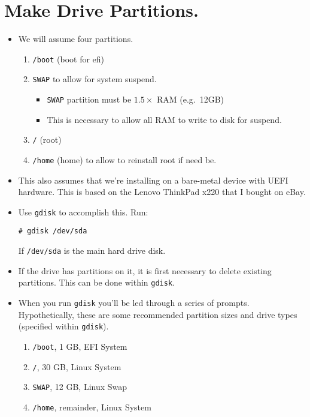 \documentclass{article}
\begin{document}
\section{Make Drive Partitions.}
  \begin{itemize}
    \item We will assume four partitions.
    \begin{enumerate}
      \item \verb|/boot| (boot for efi)
      \item \verb|SWAP| to allow for system suspend.
      \begin{itemize}
        \item \verb|SWAP| partition must be $1.5\times$ RAM (e.g.~12GB)
        \item This is necessary to allow all RAM to write to disk for suspend.
      \end{itemize}
      \item \verb|/| (root)
      \item \verb|/home| (home) to allow to reinstall root if need be.
    \end{enumerate}
    \item This also assumes that we're installing on a bare-metal device with
      UEFI hardware. This is based on the Lenovo ThinkPad x220 that I bought on
      eBay.
    \item Use \verb|gdisk| to accomplish this. Run: 
\begin{verbatim}
# gdisk /dev/sda
\end{verbatim}
      If \verb|/dev/sda| is the main hard drive disk.
    \item If the drive has partitions on it, it is first necessary to delete
      existing partitions. This can be done within \verb|gdisk|.
    \item When you run \verb|gdisk| you'll be led through a series of prompts.
      Hypothetically, these are some recommended partition sizes and drive types
      (specified within \verb|gdisk|).
    \begin{enumerate}
      \item \verb|/boot|, 1 GB, EFI System
      \item \verb|/|, 30 GB, Linux System
      \item \verb|SWAP|, 12 GB, Linux Swap
      \item \verb|/home|, remainder, Linux System
    \end{enumerate}
\end{itemize}
\end{document}
